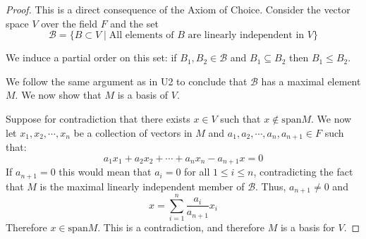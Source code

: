 \documentclass[a4paper]{report}
\begin{document}
\begin{proof}
  This is a direct consequence of the Axiom of Choice.
  Consider the vector space $V$ over the field $F$ and the set
  \[
    \mathcal{B} = \{B \subset V \mid \text{All elements of } B \text{ are linearly independent in } V \}    
  \]

  We induce a partial order on this set: if $B_1, B_2 \in \mathcal{B}$ and $B_1 \subseteq B_2$ then $B_1 \leq B_2$.

  We follow the same argument as in U2 to conclude that $\mathcal{B}$ has a maximal element $M$. We now show that $M$ is a basis of $V$.

  Suppose for contradiction that there exists $x \in V$ such that $x \notin \mathrm{span}M$. We now let $x_1, x_2, \cdots, x_n$ be a collection of vectors in $M$ and $a_1, a_2, \cdots, a_n, a_{n + 1} \in F$ such that:
  \[
    a_1x_1 + a_2x_2 + \cdots + a_nx_n - a_{n + 1}x = 0
  \]
  If $a_{n + 1}=0$ this would mean that $a_i = 0$ for all $1 \leq i \leq n$, contradicting the fact that $M$ is the maximal linearly independent member of $\mathcal{B}$. Thus,  $a_{n + 1}\neq 0$ and
  \[
    x = \sum_{i = 1}^n{\frac{a_i}{a_{n + 1}}x_i}    
  \]
  Therefore $x \in \mathrm{span}{M}$. This is a contradiction, and therefore $M$ is a basis for $V$.

\end{proof}



\end{document}
